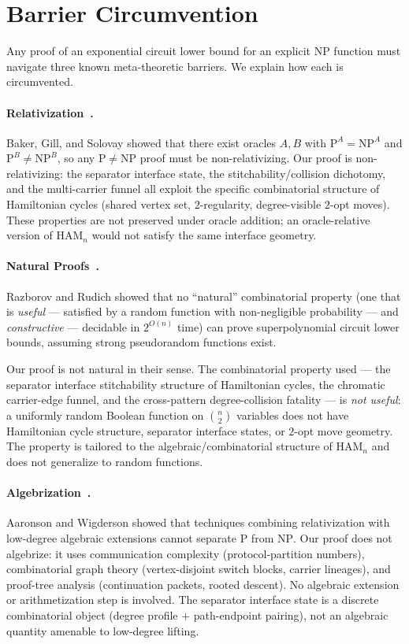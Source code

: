 \documentclass[11pt]{article}
\newcommand{\Ham}{\mathrm{HAM}}
\begin{document}
\section{Barrier Circumvention}
\label{sec:barriers}

Any proof of an exponential circuit lower bound for an explicit NP
function must navigate three known meta-theoretic barriers.  We explain
how each is circumvented.

\paragraph{Relativization~\cite{BGS75}.}
Baker, Gill, and Solovay showed that there exist oracles $A, B$ with
$\mathrm{P}^A = \mathrm{NP}^A$ and $\mathrm{P}^B \neq \mathrm{NP}^B$,
so any $\mathrm{P} \neq \mathrm{NP}$ proof must be non-relativizing.
Our proof is non-relativizing: the separator interface state, the
stitchability/collision dichotomy, and the multi-carrier funnel all
exploit the specific combinatorial structure of Hamiltonian cycles
(shared vertex set, $2$-regularity, degree-visible $2$-opt moves).
These properties are not preserved under oracle addition; an
oracle-relative version of $\Ham_n$ would not satisfy the same
interface geometry.

\paragraph{Natural Proofs~\cite{RR97}.}
Razborov and Rudich showed that no ``natural'' combinatorial property
(one that is \emph{useful} --- satisfied by a random function with
non-negligible probability --- and \emph{constructive} --- decidable in
$2^{O(n)}$ time) can prove superpolynomial circuit lower bounds, assuming
strong pseudorandom functions exist.

Our proof is not natural in their sense.  The combinatorial property
used --- the separator interface stitchability structure of Hamiltonian
cycles, the chromatic carrier-edge funnel, and the cross-pattern
degree-collision fatality --- is \emph{not useful}: a uniformly random
Boolean function on $\binom{n}{2}$ variables does not have Hamiltonian
cycle structure, separator interface states, or $2$-opt move geometry.
The property is tailored to the algebraic/combinatorial structure of
$\Ham_n$ and does not generalize to random functions.

\paragraph{Algebrization~\cite{AW09}.}
Aaronson and Wigderson showed that techniques combining relativization
with low-degree algebraic extensions cannot separate $\mathrm{P}$ from
$\mathrm{NP}$.  Our proof does not algebrize: it uses communication
complexity (protocol-partition numbers), combinatorial graph theory
(vertex-disjoint switch blocks, carrier lineages), and proof-tree
analysis (continuation packets, rooted descent).  No algebraic extension
or arithmetization step is involved.  The separator interface state is a
discrete combinatorial object (degree profile + path-endpoint pairing),
not an algebraic quantity amenable to low-degree lifting.
\end{document}
